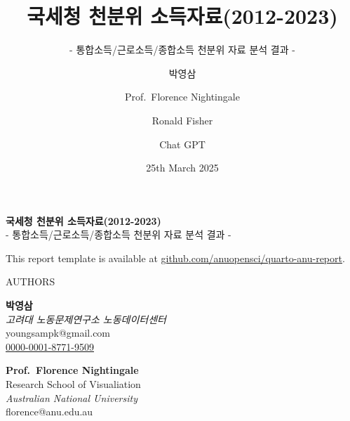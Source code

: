 \documentclass[
  a4paper,
  oneside,
  open=any]{scrbook}
\title{국세청 천분위 소득자료(2012-2023)}
\subtitle{- 통합소득/근로소득/종합소득 천분위 자료 분석 결과 -}
\author{박영삼 \and Prof.~Florence Nightingale \and Ronald
Fisher \and Chat GPT}
\date{25th March 2025}
\newcommand{\orcid}[1]{\href{https://orcid.org/#1}{\textcolor{orcidlogocol}{\faOrcid} #1}}
\begin{document}
  \begin{frontmatter}
  \begin{titlepage}

  \begin{minipage}[b][\textheight][s]{\textwidth}
  \raggedright


  {\Huge\bfseries{국세청 천분위 소득자료(2012-2023)}}\\[1\baselineskip]
  {\LARGE{- 통합소득/근로소득/종합소득 천분위 자료 분석 결과
  -}}\\[1\baselineskip]
    \vspace{3mm}

      This report template is available at
      \href{https://github.com/anuopensci/quarto-anu-report}{github.com/anuopensci/quarto-anu-report}.

  \begin{titlepagebox}



  \textcolor{anugold}{\MakeUppercase{Authors}}
  \vspace{-3mm}
  \begin{multicols}{2}
      \begin{minipage}{\columnwidth}
      \raggedright
      \normalfont
      {\textbf{박영삼}}\\
          
      {\itshape{고려대 노동문제연구소 노동데이터센터}}\\
           youngsampk@gmail.com\\
      
      \orcid{0000-0001-8771-9509}\\
      \vspace{4mm}
      \end{minipage}

      \begin{minipage}{\columnwidth}
      \raggedright
      \normalfont
      {\textbf{Prof.~Florence Nightingale}}\\
          {Research School of Visualiation}\\
      {\itshape{Australian National University}}\\
           florence@anu.edu.au\\
      

\end{minipage}
\end{multicols}
\end{titlepagebox}
\end{minipage}
\end{titlepage}
\end{frontmatter}
\end{document}
